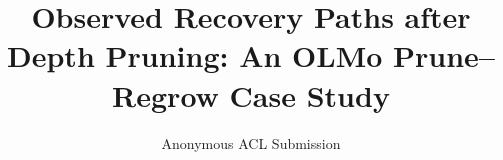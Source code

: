 \documentclass[11pt]{article}
\title{Observed Recovery Paths after Depth Pruning:
An OLMo Prune--Regrow Case Study}
\author{Anonymous ACL Submission}
\begin{document}
\maketitle








\FloatBarrier

\FloatBarrier

\FloatBarrier





\clearpage
\appendix
\raggedbottom

\end{document}
